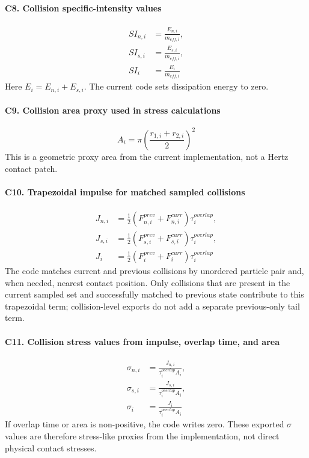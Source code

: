 \documentclass[11pt,a4paper]{article}
\begin{document}
\paragraph{C8. Collision specific-intensity values}
\[
\begin{aligned}
SI_{n,i} &= \frac{E_{n,i}}{m_{eff,i}}, \\
SI_{s,i} &= \frac{E_{s,i}}{m_{eff,i}}, \\
SI_i &= \frac{E_i}{m_{eff,i}}
\end{aligned}
\]
Here $E_i = E_{n,i} + E_{s,i}$. The current code sets dissipation energy to zero.

\paragraph{C9. Collision area proxy used in stress calculations}
\[
A_i = \pi \left(\frac{r_{1,i} + r_{2,i}}{2}\right)^2
\]
This is a geometric proxy area from the current implementation, not a Hertz contact patch.

\paragraph{C10. Trapezoidal impulse for matched sampled collisions}
\[
\begin{aligned}
J_{n,i} &= \frac{1}{2}\left(F_{n,i}^{prev} + F_{n,i}^{curr}\right)\tau_i^{overlap}, \\
J_{s,i} &= \frac{1}{2}\left(F_{s,i}^{prev} + F_{s,i}^{curr}\right)\tau_i^{overlap}, \\
J_i &= \frac{1}{2}\left(F_i^{prev} + F_i^{curr}\right)\tau_i^{overlap}
\end{aligned}
\]
The code matches current and previous collisions by unordered particle pair and, when needed, nearest contact position.
Only collisions that are present in the current sampled set and successfully matched to previous state contribute to this trapezoidal term; collision-level exports do not add a separate previous-only tail term.

\paragraph{C11. Collision stress values from impulse, overlap time, and area}
\[
\begin{aligned}
\sigma_{n,i} &= \frac{J_{n,i}}{\tau_i^{overlap} A_i}, \\
\sigma_{s,i} &= \frac{J_{s,i}}{\tau_i^{overlap} A_i}, \\
\sigma_i &= \frac{J_i}{\tau_i^{overlap} A_i}
\end{aligned}
\]
If overlap time or area is non-positive, the code writes zero.
These exported $\sigma$ values are therefore stress-like proxies from the implementation, not direct physical contact stresses.
\end{document}
